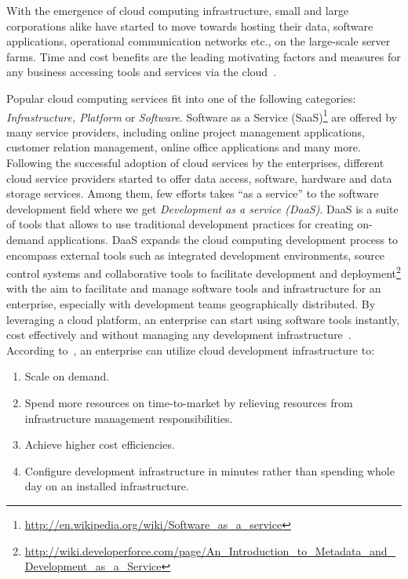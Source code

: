 \documentclass[11pt,fleqn,twoside]{article}
\begin{document}
With the emergence of cloud computing infrastructure, small and large corporations alike have started to move towards hosting their data, software applications, operational communication networks etc., on the large-scale server farms. Time and cost benefits are the leading motivating factors and measures for any business accessing tools and services via the cloud~\cite{Willie:11}.

Popular cloud computing services fit into one of the following categories: \emph{Infrastructure, Platform} or \emph{Software}. Software as a Service (SaaS)\footnote{\url{http://en.wikipedia.org/wiki/Software_as_a_service}} are offered by many service providers, including online project management applications, customer relation management, online office applications and many more. Following the successful adoption of cloud services by the enterprises, different cloud service providers started to offer data access, software, hardware and data storage services. Among them, few efforts takes ``as a service'' to the software development field where we get \textit{Development as a service (DaaS)}. DaaS is a suite of tools that allows to use traditional development practices for creating on-demand applications. DaaS expands the cloud computing development process to encompass external tools such as integrated development environments, source control systems and collaborative tools to facilitate development and deployment\footnote{\url{http://wiki.developerforce.com/page/An_Introduction_to_Metadata_and_Development_as_a_Service}} with the aim to facilitate and manage software tools and infrastructure for an enterprise, especially with development teams geographically distributed. By leveraging a cloud platform, an enterprise can start using software tools instantly, cost effectively and without managing any development infrastructure~\cite{Willie:11}. According to~\cite{Armbrust:CACM2010}, an enterprise can utilize cloud development infrastructure to:
\begin{enumerate}
        \item Scale on demand.
        \item Spend more resources on time-to-market by relieving resources from infrastructure management responsibilities.
        \item Achieve higher cost efficiencies.
        \item Configure development infrastructure in minutes rather than spending whole day on an installed infrastructure.
\end{enumerate}
\end{document}
